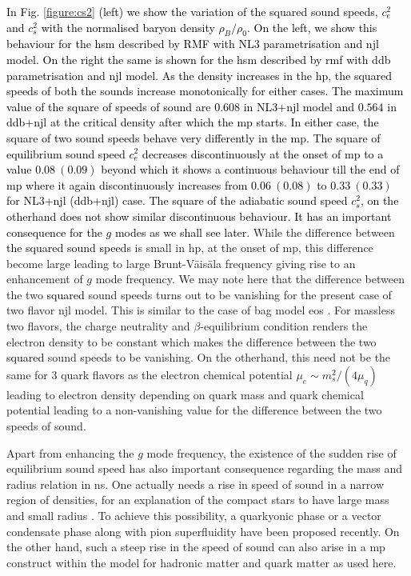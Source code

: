 \documentclass[a4paper, 11pt]{article}
\newcommand{\magenta}[1]{\textcolor{black}{#1}}
\begin{document}
\magenta{In Fig. \ref{figure:cs2} (left) we show the variation of the squared sound speeds,  $c_e^2$ and $c_s^2$ 
with the normalised baryon density $\rho_B/\rho_0$. On the left, we show this behaviour for the \ac{hsm}
described by RMF with NL3 parametrisation and \ac{njl} model. On the right the same is shown for the
\ac{hsm} described by \ac{rmf} with \ac{ddb} parametrisation and \ac{njl} model. 
 As the density increases in the \ac{hp}, 
the squared speeds of both the sounds increase monotonically for either cases. The maximum value of 
\magenta{the square of} speeds of sound 
are $0.608$ in NL3+\ac{njl} model and $0.564$ in \ac{ddb}+\ac{njl} at the critical density after which 
the \ac{mp} starts. In either case, the \magenta{square of} two sound speeds behave very differently in the \ac{mp}. 
The \magenta{square of} equilibrium sound speed $c_e^2$ decreases discontinuously at the onset of \ac{mp} to a value $0.08\ (0.09)$ beyond which 
it shows a continuous behaviour till the end of \ac{mp} where it again discontinuously increases from $0.06\ (0.08)$ 
to $0.33\ (0.33)$ for NL3+\ac{njl} (\ac{ddb}+\ac{njl}) case. The \magenta{square of} the adiabatic sound speed $c_s^2$, 
on the otherhand does not show similar discontinuous behaviour. It has an important consequence for the $g$ modes 
as we shall see later.}
 While the difference between \magenta{the squared sound speeds }  is small in \ac{hp}, 
at the onset of \ac{mp}, this difference become 
large leading to large Brunt-V\" {a}is\" {a}la frequency giving rise to  an enhancement of $g$ mode frequency.
We may note here that the difference between the two \magenta{squared } sound speeds turns out to be vanishing for the 
present case of two flavor \ac{njl} model. This is similar to the case of bag model \ac{eos} \cite{Wei:2018}.
For massless two flavors, the charge neutrality and $\beta$-equilibrium condition renders the electron density to be constant
which makes the difference between the two \magenta{squared } sound speeds to be vanishing. On the otherhand, this need not be the same for 3 quark flavors as the electron chemical potential $\mu_e\sim m_s^2/(4\mu_q)$ leading to electron density depending on
quark mass and quark chemical potential leading to a non-vanishing value for the difference between the two speeds of sound.

 Apart from enhancing the $g$ mode frequency, the existence of the sudden rise of equilibrium sound speed 
has also important consequence regarding the mass and radius relation in \ac{ns}. One actually needs a rise in speed of sound in a narrow region of densities, for an explanation of the compact stars to have large mass and small radius \cite{McLerran:2018}. To achieve this possibility, a quarkyonic phase \cite{McLerran:2018} or a vector condensate phase along with pion superfluidity \cite{Pisarski:2021} have been proposed recently. On the other hand, such a steep rise in the speed of sound can also arise in a \ac{mp} construct  within the model for hadronic matter and quark matter as used here.
\end{document}
